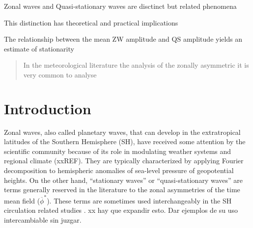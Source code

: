 \documentclass[draft,linenumbers]{agujournal2018}
\begin{document}



\begin{keypoints}
\item Zonal waves and Quasi-stationary waves are disctinct but related
phenomena
\item This distinction has theoretical and practical implications
\item The relationship between the mean ZW amplitude and QS amplitude yields
an estimate of stationarity
\end{keypoints}

%
%


\begin{abstract}
In the meteorological literature the analysis of the zonally asymmetric
it is very common to analyse
\end{abstract}

\section{Introduction}

Zonal waves, also called planetary waves, that can develop in the
extratropical latitudes of the Southern Hemisphere (SH), have received
some attention by the scientific community because of its role in
modulating weather systems and regional climate (xxREF). They are
typically characterized by applying Fourier decomposition to hemispheric
anomalies of sea-level pressure of geopotential heights. On the other
hand, ``stationary waves'' or ``quasi-stationary waves'' are terms
generally reserved in the literature to the zonal asymmetries of the
time mean field (\(\overline{\phi}^*\)). These terms are sometimes used
interchangeably in the SH circulation related studies
\citep[e.g.][]{Rao2004, Raphael2004, Kravchenko2012, Irving2015, Turner2017, Lastovicka2018}.
xx hay que expandir esto. Dar ejemplos de su uso intercambiable sin
juzgar.
\end{document}
